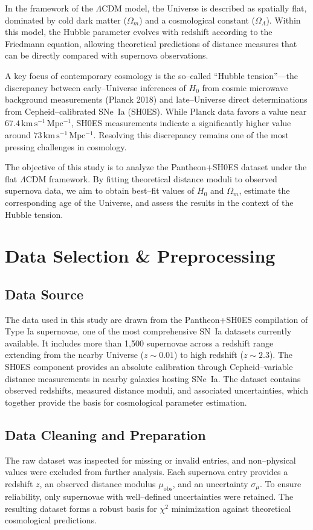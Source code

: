 \documentclass[12pt]{article}
\begin{document}
In the framework of the $\Lambda$CDM model, the Universe is described as spatially flat, dominated by cold dark matter ($\Omega_m$) and a 
cosmological constant ($\Omega_\Lambda$). Within this model, the Hubble parameter evolves with redshift according to the Friedmann equation, 
allowing theoretical predictions of distance measures that can be directly compared with supernova observations.

A key focus of contemporary cosmology is the so–called ``Hubble tension''—the discrepancy between early–Universe inferences of $H_0$ from 
cosmic microwave background measurements (Planck 2018) and late–Universe direct determinations from Cepheid–calibrated SNe~Ia (SH0ES). 
While Planck data favors a value near $67.4 \,\mathrm{km\,s^{-1}\,Mpc^{-1}}$, SH0ES measurements indicate a significantly higher value 
around $73 \,\mathrm{km\,s^{-1}\,Mpc^{-1}}$. Resolving this discrepancy remains one of the most pressing challenges in cosmology.

The objective of this study is to analyze the Pantheon+SH0ES dataset under the flat $\Lambda$CDM framework. By fitting theoretical 
distance moduli to observed supernova data, we aim to obtain best–fit values of $H_0$ and $\Omega_m$, estimate the corresponding age of 
the Universe, and assess the results in the context of the Hubble tension.

\section{Data Selection \& Preprocessing}
\subsection{Data Source}
The data used in this study are drawn from the Pantheon+SH0ES compilation of Type Ia supernovae, one of the most comprehensive SN~Ia datasets currently available. 
It includes more than 1{,}500 supernovae across a redshift range extending from the nearby Universe ($z \sim 0.01$) to high redshift ($z \sim 2.3$). 
The SH0ES component provides an absolute calibration through Cepheid–variable distance measurements in nearby galaxies hosting SNe~Ia. 
The dataset contains observed redshifts, measured distance moduli, and associated uncertainties, which together provide the basis for cosmological parameter estimation.

\subsection{Data Cleaning and Preparation}
The raw dataset was inspected for missing or invalid entries, and non–physical values were excluded from further analysis. Each supernova entry provides a redshift $z$, 
an observed distance modulus $\mu_{\mathrm{obs}}$, and an uncertainty $\sigma_\mu$. To ensure reliability, only supernovae with well–defined uncertainties were retained. 
The resulting dataset forms a robust basis for $\chi^2$ minimization against theoretical cosmological predictions.
\end{document}

